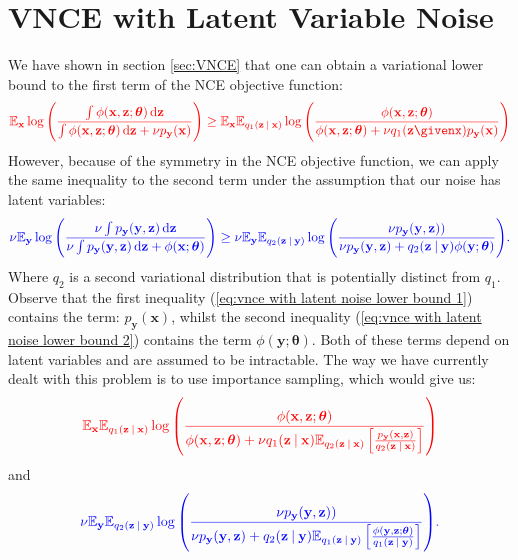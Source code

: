 \documentclass[11pt, oneside]{article}
\newcommand{\thetab}{{\boldsymbol{\theta}}}
\newcommand{\pnn}{\phi}
\newcommand{\pnoise}{p_{ \mathbf y}}
\newcommand{\x}{{\mathbf x}}
\newcommand{\y}{{\mathbf y}}
\newcommand{\z}{{\mathbf z}}
\newcommand{\E}{\mathbb{E}}
\newcommand{\Ex}{\E_{\x}}
\newcommand{\Ey}{\E_{\y}}
\newcommand\given[1][]{\:#1\vert\:}
\theoremstyle{definition}
\begin{document}
{\section{VNCE with Latent Variable Noise}
\label{sec:vnce with latent variable noise}
We have shown in section \ref{sec:VNCE} that one can obtain a variational lower bound to the first term of the NCE objective function:
\begin{align}
\label{eq:vnce with latent noise lower bound 1}
    \color{red}{\Ex  \log \left(\frac{\int \pnn(\x, \z;\thetab) \dif \z}{\int \pnn(\x, \z;\thetab) \dif \z + \nu \pnoise(\x)}\right)}
    \geq  \color{red}{\Ex \mathbb{E}_{q_1(\z \given \x)} \log \left( \frac{\pnn(\x,\z; \thetab)}{\pnn(\x,\z; \thetab) + \nu q_1(\z \givenx)\pnoise(\x)} \right)}
\end{align}
However, because of the symmetry in the NCE objective function, we can apply the same inequality to the second term under the assumption that our noise has latent variables:
\begin{align}
\label{eq:vnce with latent noise lower bound 2}
    \color{blue}{\nu \Ey  \log \left(\frac{ \nu \int \pnoise(\y, \z) \dif \z}{\nu \int \pnoise(\y, \z) \dif \z + \pnn(\x ; \thetab)} \right)}
    \geq  \color{blue}{ \nu \Ey \mathbb{E}_{q_2(\z \given \y)} \log \left( \frac{\nu \pnoise(\y, \z))}{\nu \pnoise(\y, \z) +  q_2(\z \given \y) \pnn(\y ; \thetab) } \right)}.
\end{align}
Where $q_2$ is a second variational distribution that is potentially distinct from $q_1$. Observe that the first inequality (\ref{eq:vnce with latent noise lower bound 1}) contains the term: $\pnoise(\x)$, whilst the second inequality (\ref{eq:vnce with latent noise lower bound 2}) contains the term $\pnn(\y; \thetab)$. Both of these terms depend on latent variables and are assumed to be intractable. The way we have currently dealt with this problem is to use importance sampling, which would give us:
\begin{align}
\label{eq:variational noise, term 1 with importance sampling}
    \color{red}{\Ex \mathbb{E}_{q_1(\z \given \x)} \log \left( \frac{\pnn(\x,\z; \thetab)}{\pnn(\x,\z; \thetab) + \nu q_1(\z \given \x) \mathbb{E}_{q_2(\z \given \x)} \left[ \frac{\pnoise(\x, \z)}{q_2(\z \given \x)} \right]} \right)}
\end{align}
and 
\begin{align}
\label{eq:variational noise, term 2 with importance sampling}
    \color{blue}{ \nu \Ey \mathbb{E}_{q_2(\z \given \y)} \log \left( \frac{\nu \pnoise(\y, \z))}{\nu \pnoise(\y, \z) +  q_2(\z \given \y) \mathbb{E}_{q_1(\z \given \y)}\left[ \frac{\pnn(\y , \z; \thetab)}{q_1(\z \given \y)} \right] } \right)}.

\end{align}}
\end{document}
